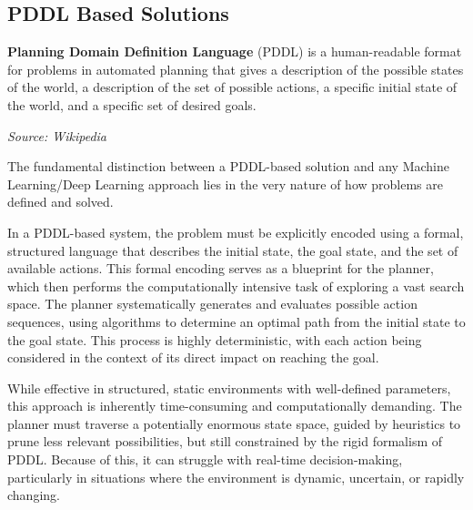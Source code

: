 
\subsection{PDDL Based Solutions}
\label{sub:pddl_based_solutions}
\begin{blockquote}
  \textbf{Planning Domain Definition Language} (PDDL) is a human-readable format
  for problems in automated planning that gives a description of the possible
  states of the world, a description of the set of possible actions, a specific
  initial state of the world, and a specific set of desired goals.

  \emph{Source: Wikipedia\footnotemark}
\end{blockquote}

The fundamental distinction between a PDDL-based solution and any Machine
Learning/Deep Learning approach lies in the very nature of how problems are
defined and solved.

In a PDDL-based system, the problem must be explicitly encoded using a formal,
structured language that describes the initial state, the goal state, and the
set of available actions. This formal encoding serves as a blueprint for the planner,
which then performs the computationally intensive task of exploring a vast
search space. The planner systematically generates and evaluates possible action
sequences, using algorithms to determine an optimal path from the initial state
to the goal state. This process is highly deterministic, with each action being
considered in the context of its direct impact on reaching the goal.

While effective in structured, static environments with well-defined parameters,
this approach is inherently time-consuming and computationally demanding. The planner
must traverse a potentially enormous state space, guided by heuristics to prune
less relevant possibilities, but still constrained by the rigid formalism of PDDL.
Because of this, it can struggle with real-time decision-making, particularly in
situations where the environment is dynamic, uncertain, or rapidly changing.

